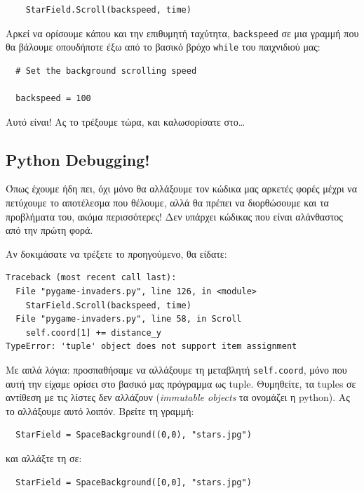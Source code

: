 \begin{verbatim}
    StarField.Scroll(backspeed, time)
\end{verbatim}

Αρκεί να ορίσουμε κάπου και την επιθυμητή ταχύτητα, {\tt backspeed} σε μια γραμμή που θα βάλουμε οπουδήποτε έξω από το βασικό βρόχο {\tt while} του παιχνιδιού μας:

\begin{verbatim}
  # Set the background scrolling speed

  backspeed = 100
\end{verbatim}

Αυτό είναι! Ας το τρέξουμε τώρα, και καλωσορίσατε στο\ldots{}
%
\subsection{Python Debugging!}
%
Όπως έχουμε ήδη πει, όχι μόνο θα αλλάξουμε τον κώδικα μας αρκετές φορές μέχρι να πετύχουμε το αποτέλεσμα που θέλουμε, αλλά θα πρέπει να διορθώσουμε και τα προβλήματα του, ακόμα περισσότερες! Δεν υπάρχει κώδικας που είναι αλάνθαστος από την πρώτη φορά.

Αν δοκιμάσατε να τρέξετε το προηγούμενο, θα είδατε:
%
\begin{verbatim}
Traceback (most recent call last):
  File "pygame-invaders.py", line 126, in <module>
    StarField.Scroll(backspeed, time)
  File "pygame-invaders.py", line 58, in Scroll
    self.coord[1] += distance_y
TypeError: 'tuple' object does not support item assignment
\end{verbatim}
%
Με απλά λόγια: προσπαθήσαμε να αλλάξουμε τη μεταβλητή {\tt self.coord}, μόνο που αυτή την είχαμε ορίσει στο βασικό μας πρόγραμμα ως tuple. Θυμηθείτε, τα tuples σε αντίθεση με τις λίστες δεν αλλάζουν (\emph{immutable objects} τα ονομάζει η python). Ας το αλλάξουμε αυτό λοιπόν. Βρείτε τη γραμμή:

\begin{verbatim}
  StarField = SpaceBackground((0,0), "stars.jpg")
\end{verbatim}

και αλλάξτε τη σε:

\begin{verbatim}
  StarField = SpaceBackground([0,0], "stars.jpg")
\end{verbatim}

